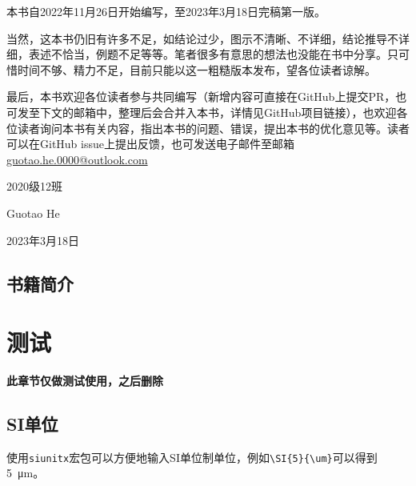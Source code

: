 \documentclass{gbook}
\begin{document}
本书自2022年11月26日开始编写，至2023年3月18日完稿第一版。

当然，这本书仍旧有许多不足，如结论过少，图示不清晰、不详细，结论推导不详细，表述不恰当，例题不足等等。笔者很多有意思的想法也没能在书中分享。只可惜时间不够、精力不足，目前只能以这一粗糙版本发布，望各位读者谅解。

最后，本书欢迎各位读者参与共同编写（新增内容可直接在GitHub上提交PR，也可发至下文的邮箱中，整理后会合并入本书，详情见GitHub项目链接），也欢迎各位读者询问本书有关内容，指出本书的问题、错误，提出本书的优化意见等。读者可以在GitHub issue上提出反馈，也可发送电子邮件至邮箱\url{guotao.he.0000@outlook.com}
~\\

\begin{flushright}
2020级12班

Guotao He

2023年3月18日
\end{flushright}
\newpage

\section*{书籍简介}


\newpage


\setcounter{page}{1}

\tableofcontents

\newpage

\setcounter{page}{1}










\chapter{测试}

\textbf{此章节仅做测试使用，之后删除}

\section{SI单位}

使用\verb+siunitx+宏包可以方便地输入SI单位制单位，例如\verb+\SI{5}{\um}+可以得到\SI{5}{\um}。
\end{document}
